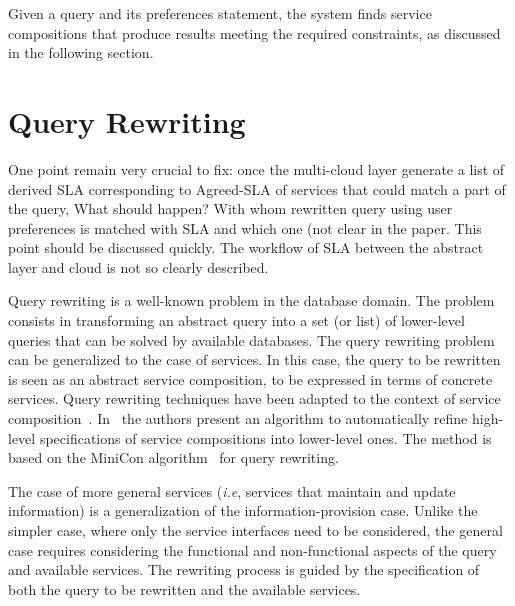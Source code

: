Given a query and its preferences statement, the system  finds  service compositions that produce results   meeting the required constraints, as discussed in the following section.
 
\section{Query Rewriting}
\label{sec:queryRew}

\color{red}
One point remain very crucial to fix: once the multi-cloud layer generate a list of derived SLA corresponding to Agreed-SLA of services that could match a part of the query, What should happen?  With whom rewritten query using user preferences is matched with SLA and which one (not clear in the paper.  This point should be discussed quickly. The workflow of SLA between the abstract layer and cloud is not so clearly described.

\color{black}
Query rewriting is a well-known problem in the database domain.
The problem consists in transforming an abstract query into a set (or list) of lower-level queries that can be solved by  available databases.
The query rewriting problem can be generalized to the case of services.
In this case, the query to be rewritten is seen as an abstract service composition, to be expressed in terms of concrete services.
Query rewriting techniques have been adapted to the context of service composition~\cite{BBM10,ZLC11,CostaAMR13}. 
In~\cite{CostaAMR13} the authors present an algorithm to automatically refine high-level specifications of service compositions into lower-level ones. 
The method is based on the MiniCon algorithm~\cite{PH01} for query rewriting.

The case of more general services (\textit{i.e}, services that maintain and update information) is a generalization of the information-provision case.
Unlike the simpler case, where only the service interfaces need to be considered, the general case requires considering the functional and non-functional aspects of the query and available services.
The rewriting process is guided by the specification of both the query to be rewritten and the available services.


